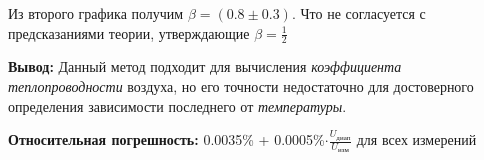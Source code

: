 Из второго графика получим $\beta = (0.8\pm0.3)$. Что не согласуется с предсказаниями теории, утверждающие $\beta = \frac{1}{2}$

\textbf{Вывод:} Данный метод подходит для вычисления \textit{коэффициента теплопроводности} воздуха, но его точности недостаточно для достоверного определения зависимости последнего от \textit{температуры}.






















\newpage


\textbf{Относительная погрешность:} 0.0035\% + 0.0005\%$\cdot\frac{U_{диап}}{U_{изм}}$ для всех измерений

\begin{equation*}
\end{equation*}

